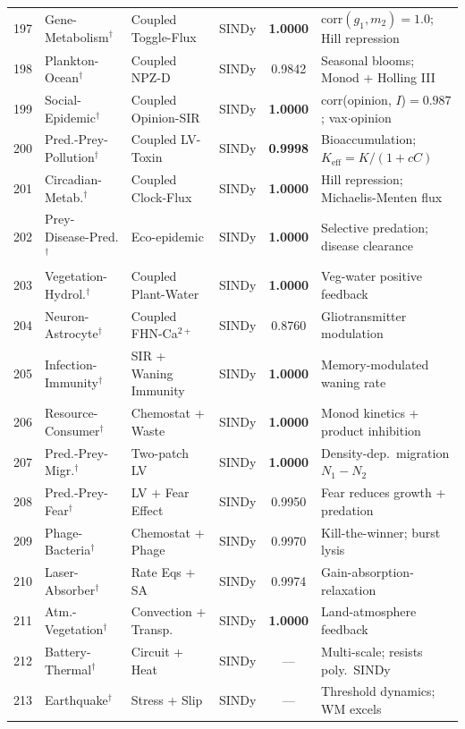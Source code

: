 \begin{table}[t]
\begin{tabular}{rlllcl}
197 & Gene-Metabolism$^\dagger$ & Coupled Toggle-Flux & SINDy & \textbf{1.0000} & corr$(g_1, m_2){=}1.0$; Hill repression \\
198 & Plankton-Ocean$^\dagger$ & Coupled NPZ-D & SINDy & 0.9842 & Seasonal blooms; Monod + Holling III \\
199 & Social-Epidemic$^\dagger$ & Coupled Opinion-SIR & SINDy & \textbf{1.0000} & corr(opinion, $I$)$=0.987$; vax${\cdot}$opinion \\
200 & Pred.-Prey-Pollution$^\dagger$ & Coupled LV-Toxin & SINDy & \textbf{0.9998} & Bioaccumulation; $K_\text{eff}{=}K/(1{+}cC)$ \\
201 & Circadian-Metab.$^\dagger$ & Coupled Clock-Flux & SINDy & \textbf{1.0000} & Hill repression; Michaelis-Menten flux \\
202 & Prey-Disease-Pred.$^\dagger$ & Eco-epidemic & SINDy & \textbf{1.0000} & Selective predation; disease clearance \\
203 & Vegetation-Hydrol.$^\dagger$ & Coupled Plant-Water & SINDy & \textbf{1.0000} & Veg-water positive feedback \\
204 & Neuron-Astrocyte$^\dagger$ & Coupled FHN-Ca$^{2+}$ & SINDy & 0.8760 & Gliotransmitter modulation \\
205 & Infection-Immunity$^\dagger$ & SIR + Waning Immunity & SINDy & \textbf{1.0000} & Memory-modulated waning rate \\
206 & Resource-Consumer$^\dagger$ & Chemostat + Waste & SINDy & \textbf{1.0000} & Monod kinetics + product inhibition \\
207 & Pred.-Prey-Migr.$^\dagger$ & Two-patch LV & SINDy & \textbf{1.0000} & Density-dep.\ migration $N_1{-}N_2$ \\
208 & Pred.-Prey-Fear$^\dagger$ & LV + Fear Effect & SINDy & 0.9950 & Fear reduces growth + predation \\
209 & Phage-Bacteria$^\dagger$ & Chemostat + Phage & SINDy & 0.9970 & Kill-the-winner; burst lysis \\
210 & Laser-Absorber$^\dagger$ & Rate Eqs + SA & SINDy & 0.9974 & Gain-absorption-relaxation \\
211 & Atm.-Vegetation$^\dagger$ & Convection + Transp. & SINDy & \textbf{1.0000} & Land-atmosphere feedback \\
212 & Battery-Thermal$^\dagger$ & Circuit + Heat & SINDy & --- & Multi-scale; resists poly.\ SINDy \\
213 & Earthquake$^\dagger$ & Stress + Slip & SINDy & --- & Threshold dynamics; WM excels \\

\end{tabular}
\end{table}
